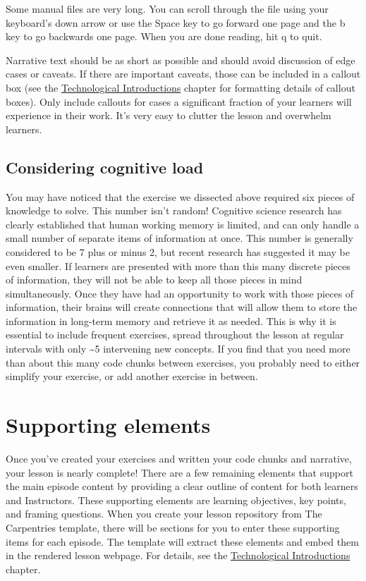 \documentclass[]{book}
\begin{document}
Some manual files are very long. You can scroll through the file using
your keyboard's down arrow or use the Space key to go forward one page
and the b key to go backwards one page. When you are done reading, hit q
to quit.

Narrative text should be as short as possible and should avoid discussion of edge cases or caveats. If there
are important caveats, those can be included in a callout box (see the
\protect\hyperlink{technological-introductions}{Technological Introductions}
chapter for formatting details of callout boxes). Only include callouts for cases a significant fraction of your
learners will experience in their work. It's very easy to clutter the lesson and overwhelm learners.

\hypertarget{considering-cognitive-load}{%
\subsection{Considering cognitive load}\label{considering-cognitive-load}}

You may have noticed that the exercise we dissected above required six pieces of knowledge to solve.
This number isn't random! Cognitive science research has clearly established that human working memory is
limited, and can only handle a small number of separate items of information at once. This number is generally
considered to be 7 plus or minus 2, but recent research has suggested it may be even smaller. If learners are
presented with more than this many discrete pieces of information, they will not be able to keep all those
pieces in mind simultaneously. Once they have had an opportunity to work with those pieces of information, their
brains will create connections that will allow them to store the information in long-term memory and retrieve it
as needed. This is why it is essential to include frequent exercises, spread throughout the lesson at regular
intervals with only \textasciitilde{}5 intervening new concepts. If you find that you need more than about this many code chunks
between exercises, you probably need to either simplify your exercise, or add another exercise in between.

\hypertarget{supporting-elements}{%
\section{Supporting elements}\label{supporting-elements}}

Once you've created your exercises and written your code chunks and narrative, your lesson is nearly complete!
There are a few remaining elements that support the main episode content by providing a clear outline
of content for both learners and Instructors. These supporting elements are learning objectives, key points, and
framing questions. When you create your lesson repository from The Carpentries template, there will be sections
for you to enter these supporting items for each episode. The template will extract these elements and embed
them in the rendered lesson webpage. For details, see the
\protect\hyperlink{technological-introductions}{Technological Introductions} chapter.
\end{document}
